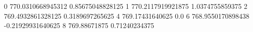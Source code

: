 0 770.0310668945312 0.85675048828125
1 770.2117919921875 1.0374755859375
2 769.4932861328125 0.3189697265625
4 769.17431640625 0.0
6 768.9550170898438 -0.21929931640625
8 769.88671875 0.71240234375
